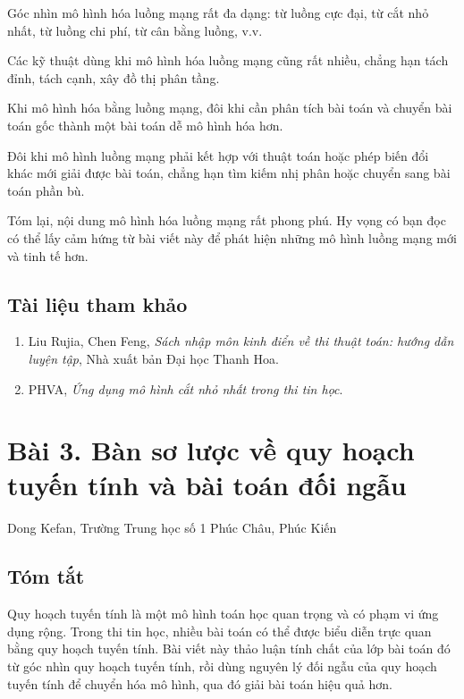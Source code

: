 \documentclass[11pt]{article}
\begin{document}
Góc nhìn mô hình hóa luồng mạng rất đa dạng: từ luồng cực đại, từ cắt nhỏ
nhất, từ luồng chi phí, từ cân bằng luồng, v.v.

Các kỹ thuật dùng khi mô hình hóa luồng mạng cũng rất nhiều, chẳng hạn tách
đỉnh, tách cạnh, xây đồ thị phân tầng.

Khi mô hình hóa bằng luồng mạng, đôi khi cần phân tích bài toán và chuyển bài
toán gốc thành một bài toán dễ mô hình hóa hơn.

Đôi khi mô hình luồng mạng phải kết hợp với thuật toán hoặc phép biến đổi
khác mới giải được bài toán, chẳng hạn tìm kiếm nhị phân hoặc chuyển sang bài
toán phần bù.

Tóm lại, nội dung mô hình hóa luồng mạng rất phong phú. Hy vọng có bạn đọc
có thể lấy cảm hứng từ bài viết này để phát hiện những mô hình luồng mạng mới
và tinh tế hơn.

\subsection*{Tài liệu tham khảo}

\begin{enumerate}
  \item Liu Rujia, Chen Feng, \emph{Sách nhập môn kinh điển về thi thuật toán:
  hướng dẫn luyện tập}, Nhà xuất bản Đại học Thanh Hoa.
  \item PHVA, \emph{Ứng dụng mô hình cắt nhỏ nhất trong thi tin học}.
\end{enumerate}

\section*{Bài 3. Bàn sơ lược về quy hoạch tuyến tính và bài toán đối ngẫu}

\begin{center}
Dong Kefan, Trường Trung học số 1 Phúc Châu, Phúc Kiến
\end{center}

\subsection*{Tóm tắt}

Quy hoạch tuyến tính là một mô hình toán học quan trọng và có phạm vi ứng dụng
rộng. Trong thi tin học, nhiều bài toán có thể được biểu diễn trực quan bằng
quy hoạch tuyến tính. Bài viết này thảo luận tính chất của lớp bài toán đó từ
góc nhìn quy hoạch tuyến tính, rồi dùng nguyên lý đối ngẫu của quy hoạch tuyến
tính để chuyển hóa mô hình, qua đó giải bài toán hiệu quả hơn.
\end{document}

